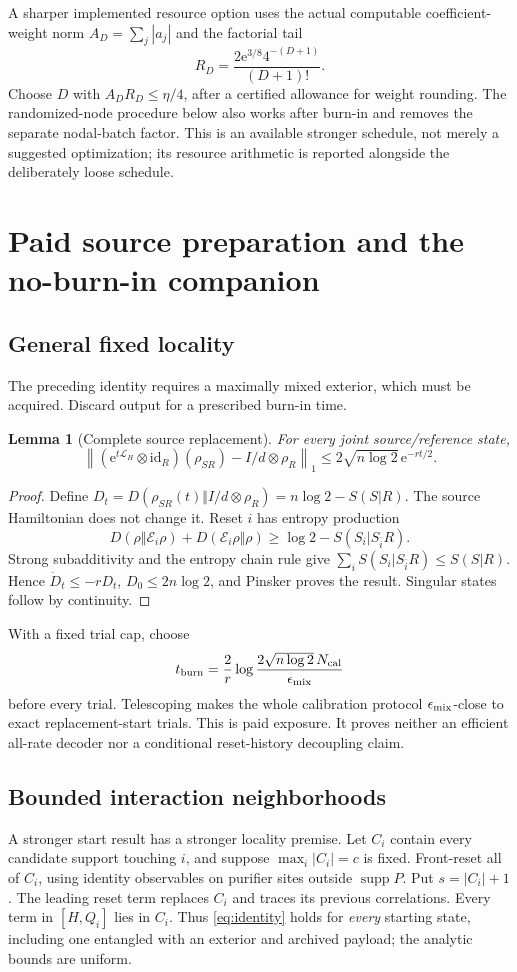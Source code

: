 \documentclass[11pt]{article}
\newtheorem{lemma}[theorem]{Lemma}
\newcommand{\id}{\mathrm{id}}
\newcommand{\supp}{\operatorname{supp}}
\newcommand{\norm}[1]{\left\lVert #1\right\rVert}
\newcommand{\cL}{\mathcal L}
\newcommand{\cE}{\mathcal E}
\newcommand{\ee}{\mathrm e}
\begin{document}
A sharper implemented resource option uses the actual computable
coefficient-weight norm \(A_D=\sum_j|a_j|\) and the factorial tail
\[
R_D=\frac{2\ee^{3/8}4^{-(D+1)}}{(D+1)!}.
\]
Choose \(D\) with \(A_DR_D\le\eta/4\), after a certified allowance for
weight rounding. The randomized-node procedure below also works after
burn-in and removes the separate nodal-batch factor. This is an available
stronger schedule, not merely a suggested optimization; its resource
arithmetic is reported alongside the deliberately loose schedule.

\section{Paid source preparation and the no-burn-in companion}
\subsection{General fixed locality}
The preceding identity requires a maximally mixed exterior, which must be
acquired. Discard output for a prescribed burn-in time.
\begin{lemma}[Complete source replacement]
For every joint source/reference state,
\[
\norm{(\ee^{t\cL_H}\otimes\id_R)(\rho_{SR})
-I/d\otimes\rho_R}_1
\le2\sqrt{n\log2}\,\ee^{-rt/2}.
\]
\end{lemma}
\begin{proof}
Define \(D_t=D(\rho_{SR}(t)\Vert I/d\otimes\rho_R)
=n\log2-S(S|R)\). The source Hamiltonian does not change it. Reset \(i\)
has entropy production
\[
D(\rho\Vert\cE_i\rho)+D(\cE_i\rho\Vert\rho)
\ge\log2-S(S_i|S_{\bar i}R).
\]
Strong subadditivity and the entropy chain rule give
\(\sum_iS(S_i|S_{\bar i}R)\le S(S|R)\). Hence
\(\dot D_t\le-rD_t\), \(D_0\le2n\log2\), and Pinsker proves the result.
Singular states follow by continuity.
\end{proof}
With a fixed trial cap, choose
\[
t_{\rm burn}=\frac2r
\log\frac{2\sqrt{n\log2}\,N_{\rm cal}}{\epsilon_{\rm mix}}
\]
before every trial. Telescoping makes the whole calibration protocol
\(\epsilon_{\rm mix}\)-close to exact replacement-start trials.
This is paid exposure. It proves neither an efficient all-rate decoder
nor a conditional reset-history decoupling claim.

\subsection{Bounded interaction neighborhoods}
A stronger start result has a stronger locality premise. Let \(C_i\)
contain every candidate support touching \(i\), and suppose
\(\max_i|C_i|=c\) is fixed. Front-reset all of \(C_i\), using identity
observables on purifier sites outside \(\supp P\). Put \(s=|C_i|+1\).
The leading reset term replaces \(C_i\) and traces its previous correlations.
Every term in \([H,Q_i]\) lies in \(C_i\). Thus \eqref{eq:identity}
holds for \emph{every} starting state, including one entangled with an
exterior and archived payload; the analytic bounds are uniform.
\end{document}
